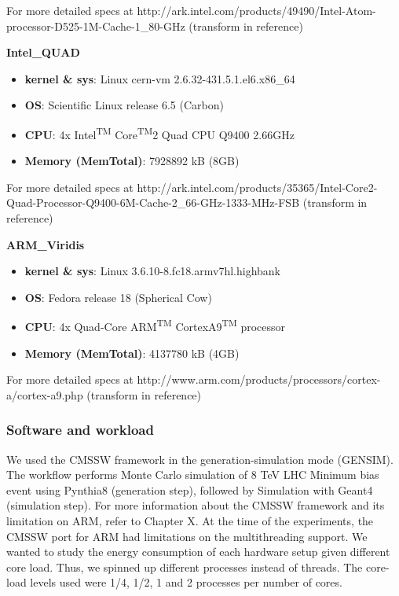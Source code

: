 For more detailed specs at http://ark.intel.com/products/49490/Intel-Atom-processor-D525-1M-Cache-1\_80-GHz (transform in reference)

\vspace{10mm}
\textbf{Intel\_QUAD}
\begin{itemize}
  \item[] \textbf{kernel \& sys}:  Linux cern-vm 2.6.32-431.5.1.el6.x86\_64
  \item[] \textbf{OS}: Scientific Linux release 6.5 (Carbon)
  \item[] \textbf{CPU}:    4x Intel\textsuperscript{TM} Core\textsuperscript{TM}2 Quad CPU  Q9400  \@ 2.66GHz
  \item[] \textbf{Memory  (MemTotal)}:        7928892 kB (8GB)
\end{itemize}

For more detailed specs at http://ark.intel.com/products/35365/Intel-Core2-Quad-Processor-Q9400-6M-Cache-2\_66-GHz-1333-MHz-FSB (transform in reference)

\vspace{10mm}
\textbf{ARM\_Viridis}
\begin{itemize}
  \item[] \textbf{kernel \& sys}:  Linux  3.6.10-8.fc18.armv7hl.highbank
  \item[] \textbf{OS}: Fedora release 18 (Spherical Cow)
  \item[] \textbf{CPU}:    4x Quad-Core ARM\textsuperscript{TM} CortexA9\textsuperscript{TM} processor
  \item[] \textbf{Memory  (MemTotal)}:        4137780 kB (4GB) 
\end{itemize}

For more detailed specs at http://www.arm.com/products/processors/cortex-a/cortex-a9.php (transform in reference)



\subsubsection*{Software and workload}
We used the CMSSW framework in the generation-simulation mode (GEN\-SIM). The workflow performs Monte Carlo simulation of 8 TeV LHC Minimum bias event using Pynthia8 (generation step), followed by Simulation with Geant4 (simulation step). For more information about the CMSSW framework and its limitation on ARM, refer to Chapter X.
At the time of the experiments, the CMSSW port for ARM had limitations on the multithreading support. We wanted to study the energy consumption of each hardware setup given different core load. Thus, we spinned up different processes instead of threads. The core-load levels used were 1/4, 1/2, 1 and 2 processes per number of cores. 

